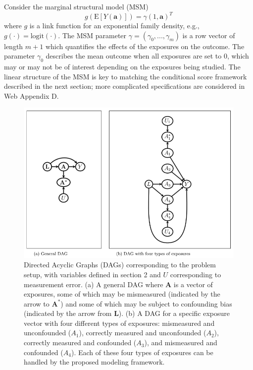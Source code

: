 \documentclass[useAMS,usenatbib,referee]{biom}
\begin{document}
Consider the marginal structural model (MSM)
\begin{equation}
    g(\text{E}[Y(\bm{a})]) = \gamma (1, \bm{a})^{T}
\end{equation}
where $g$ is a link function for an exponential family density, e.g., $g(\cdot) = \text{logit}(\cdot)$. The MSM parameter $\gamma = (\gamma_{0}, ..., \gamma_{m})$ is a row vector of length $m+1$ which quantifies the effects of the exposures on the outcome. The parameter $\gamma_{0}$ describes the mean outcome when all exposures are set to 0, which may or may not be of interest depending on the exposures being studied. The linear structure of the MSM is key to matching the conditional score framework described in the next section; more complicated specifications are considered in Web Appendix D.

\begin{figure}
\centering
\includegraphics[width=6in]{Paper1_Fig1.png}
\caption{Directed Acyclic Graphs (DAGs) corresponding to the problem setup, with variables defined in section 2 and $U$ corresponding to measurement error. (a) A general DAG where $\bm{A}$ is a vector of exposures, some of which may be mismeasured (indicated by the arrow to $\bm{A}^{*}$) and some of which may be subject to confounding bias (indicated by the arrow from $\bm{L}$). (b) A DAG for a specific exposure vector with four different types of exposures: mismeasured and unconfounded ($A_{1}$), correctly measured and unconfounded ($A_{2}$), correctly measured and confounded ($A_{3}$), and mismeasured and confounded ($A_{4}$). Each of these four types of exposures can be handled by the proposed modeling framework.}
\label{fig:one}
\end{figure}
\end{document}
